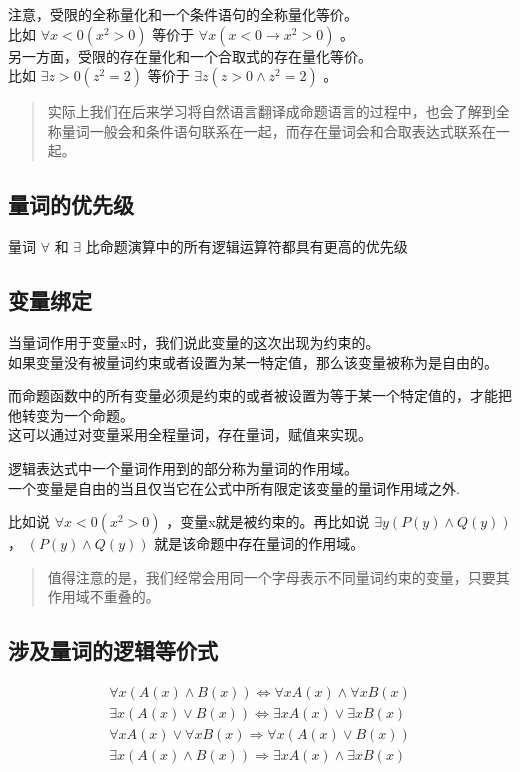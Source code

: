 \documentclass[12pt,a4paper,oneside]{ctexart}
\begin{document}
注意，受限的全称量化和一个条件语句的全称量化等价。\\
比如 \(\forall x<0(x^2>0)\) 等价于 \(\forall x(x<0\rightarrow x^2>0)\) 。\\
另一方面，受限的存在量化和一个合取式的存在量化等价。\\
比如 \(\exists z>0(z^2=2)\) 等价于 \(\exists z(z>0\wedge z^2=2)\) 。

\begin{quote}
实际上我们在后来学习将自然语言翻译成命题语言的过程中，也会了解到全称量词一般会和条件语句联系在一起，而存在量词会和合取表达式联系在一起。
\end{quote}

\subsection*{量词的优先级}

量词 \(\forall\) 和 \(\exists\) 比命题演算中的所有逻辑运算符都具有更高的优先级

\subsection*{变量绑定}

当量词作用于变量x时，我们说此变量的这次出现为约束的。\\
如果变量没有被量词约束或者设置为某一特定值，那么该变量被称为是自由的。

而命题函数中的所有变量必须是约束的或者被设置为等于某一个特定值的，才能把他转变为一个命题。\\
这可以通过对变量采用全程量词，存在量词，赋值来实现。

逻辑表达式中一个量词作用到的部分称为量词的作用域。\\
一个变量是自由的当且仅当它在公式中所有限定该变量的量词作用域之外.

比如说 \(\forall x<0(x^2>0)\) ，变量x就是被约束的。再比如说 \(\exists y(P(y)\wedge Q(y))\) ， \((P(y)\wedge Q(y))\) 就是该命题中存在量词的作用域。

\begin{quote}
值得注意的是，我们经常会用同一个字母表示不同量词约束的变量，只要其作用域不重叠的。
\end{quote}

\subsection*{涉及量词的逻辑等价式}

\[\begin{gathered}
\forall x(A(x)\wedge B(x))\Leftrightarrow \forall xA(x)\wedge\forall xB(x)\\
\exists x(A(x)\vee B(x))\Leftrightarrow \exists xA(x)\vee\exists xB(x)\\
\forall xA(x)\vee\forall xB(x)\Rightarrow\forall x(A(x)\vee B(x))\\
\exists x(A(x)\wedge B(x))\Rightarrow\exists xA(x)\wedge\exists xB(x)
\end{gathered}\]
\end{document}
